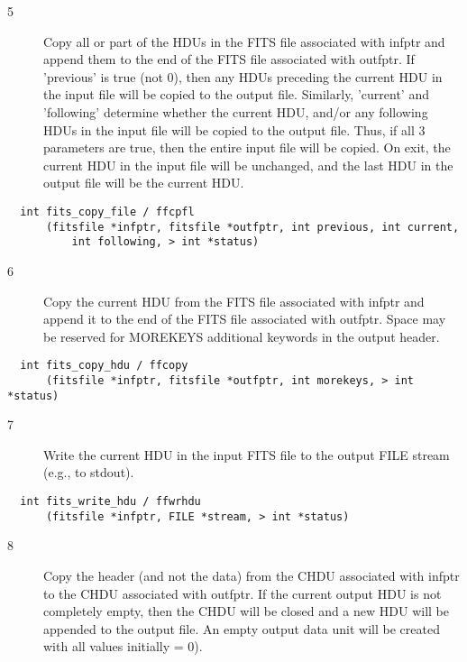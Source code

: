 \documentclass[11pt]{book}
\begin{document}
\begin{description}
\item[5 ] Copy all or part of the HDUs in the FITS file associated with infptr
    and append them to the end of the FITS file associated with
    outfptr.  If 'previous' is true (not 0), then any HDUs preceding
    the current HDU in the input file will be copied to the output
    file.  Similarly, 'current' and 'following' determine whether the
    current HDU, and/or any following HDUs in the input file will be
    copied to the output file. Thus, if all 3 parameters are true, then the
    entire input file will be copied.  On exit, the current HDU in
    the input file will be unchanged, and the last HDU in the output
   file will be the current HDU.  \label{ffcpfl}
\end{description}

\begin{verbatim}
  int fits_copy_file / ffcpfl
      (fitsfile *infptr, fitsfile *outfptr, int previous, int current,
          int following, > int *status)
\end{verbatim}

\begin{description}
\item[6 ] Copy the current HDU from the FITS file associated with infptr and append it
    to the end of the FITS file associated with outfptr.  Space may be
   reserved for MOREKEYS additional keywords in the output header. \label{ffcopy}
\end{description}

\begin{verbatim}
  int fits_copy_hdu / ffcopy
      (fitsfile *infptr, fitsfile *outfptr, int morekeys, > int *status)
\end{verbatim}

\begin{description}
\item[7 ] Write the current HDU in the input FITS file to the
   output FILE stream (e.g., to stdout). \label{ffwrhdu}
\end{description}

\begin{verbatim}
  int fits_write_hdu / ffwrhdu
      (fitsfile *infptr, FILE *stream, > int *status)
\end{verbatim}

\begin{description}
\item[8 ]  Copy the header (and not the data) from the CHDU associated with infptr
    to the CHDU associated with outfptr.  If the current output HDU
    is not completely empty, then the CHDU will be closed and a new
    HDU will be appended to the output file.   An empty output data unit
   will be created with all values initially = 0). \label{ffcphd}
\end{description}
\end{document}
